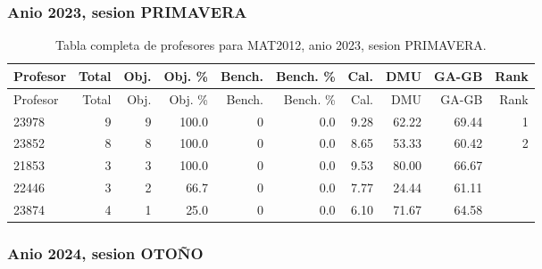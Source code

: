 \subsubsection{Anio 2023, sesion PRIMAVERA}

\begingroup
\scriptsize
\setlength{\tabcolsep}{3pt}
\begin{longtable}{lrrrrrrrrr}
\caption{Tabla completa de profesores para MAT2012, anio 2023, sesion PRIMAVERA.}\label{tab:prof-period-mat2012-2023-primavera}\\
\toprule
Profesor & Total & Obj. & Obj. \% & Bench. & Bench. \% & Cal. & DMU & GA-GB & Rank \\
\midrule
\endfirsthead
\toprule
Profesor & Total & Obj. & Obj. \% & Bench. & Bench. \% & Cal. & DMU & GA-GB & Rank \\
\midrule
\endhead
23978 & 9 & 9 & 100.0 & 0 & 0.0 & 9.28 & 62.22 & 69.44 & 1 \\
23852 & 8 & 8 & 100.0 & 0 & 0.0 & 8.65 & 53.33 & 60.42 & 2 \\
21853 & 3 & 3 & 100.0 & 0 & 0.0 & 9.53 & 80.00 & 66.67 &  \\
22446 & 3 & 2 & 66.7 & 0 & 0.0 & 7.77 & 24.44 & 61.11 &  \\
23874 & 4 & 1 & 25.0 & 0 & 0.0 & 6.10 & 71.67 & 64.58 &  \\
\bottomrule
\end{longtable}
\endgroup

\subsubsection{Anio 2024, sesion OTOÑO}

